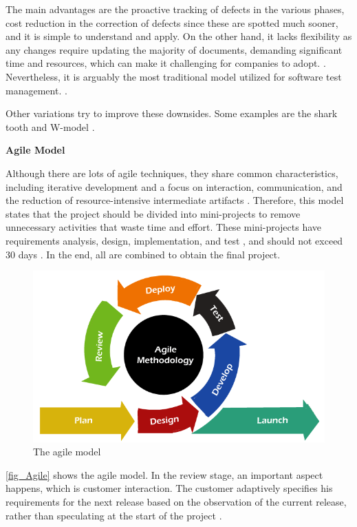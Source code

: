 The main advantages are the proactive tracking of defects in the various phases, cost reduction in the correction of defects since these are 
spotted much sooner, and it is simple to understand and apply. On the other hand, it lacks flexibility as any changes require updating the majority 
of documents, demanding significant time and resources, which can make it challenging for companies to adopt. \cite{V-model} \cite{V-model2}. 
Nevertheless, it is arguably the most traditional model utilized for software test management. \cite{mathur2010advancements}.

Other variations try to improve these downsides. Some examples are the shark tooth and W-model \cite{V-model2}.
\newline

\textbf{Agile Model}
\newline

Although there are lots of agile techniques, they share common characteristics, including iterative development and a focus on interaction, 
communication, and the reduction of resource-intensive intermediate artifacts \cite{waterfallAndAgile}. Therefore, this model states that the 
project should be divided into mini-projects to remove unnecessary activities that waste time and effort. These mini-projects have requirements 
analysis, design, implementation, and test \cite{waterfallAndAgile}, and should not exceed 30 days \cite{AgileModel}. In the end, all are 
combined to obtain the final project.

\begin{figure}[H]
	\centering
 	\includegraphics[width=0.5\linewidth]{Images/agileModel.png}
 	\caption{The agile model}
	 \label{fig_Agile}
\end{figure}

\autoref{fig_Agile} shows the agile model. In the review stage, an important aspect happens, which is customer interaction. 
The customer adaptively specifies his requirements for the next release based on the observation of the current release, rather than speculating 
at the start of the project \cite{SpiralModel}. 
\newline

